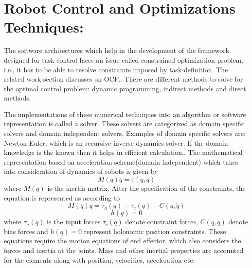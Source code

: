 \section{Robot Control and Optimizations Techniques:}
The software architectures which help in the development of the framework designed for task control faces an issue called constrained optimization problem. i.e., it has to be able to resolve constraints imposed by task definition. The related work section discusses on OCP.\cite{Reference to section related work}. There are different methods to solve for the optimal control problem:\cite{shakhimardanov2015} dynamic programming, indirect methods and direct methods.
\par
	The implementations of these numerical techniques into an algorithm or software representation is called a solver. These solvers are categorized as domain specific solvers and domain independent solvers. Examples of domain specific solvers are: Newton-Euler, which is an recursive inverse dynamics solver.  If the domain knowledge is the known then it helps in efficient calculation.\cite{shakhimardanov2015}. The mathematical representation based on acceleration scheme(domain independent) which takes into consideration of dynamics of robots is given by \cite{shakhimardanov2015}
	$$M(q)\ddot{q} = \tau(q,\dot{q})$$
	where $M(q)$ is the inertia matrix. After the specification of the constraints, the equation is represented as according to\cite{shakhimardanov2015}
	$$M(q)\ddot{q} = \tau_{a}(q) - \tau_{c}(q) - C(q,\dot{q})$$
	$$h(q) = 0$$
where $\tau_{a}(q)$ is the input forces $\tau_{c}(q)$ denote constraint forces, $C(q,\dot{q})$ denote bias forces and $h(q) = 0$ represent holonomic position constraints.\cite{shakhimardanov2015}
These equations require the motion equations of end effector, which also considers the forces and inertia at the joints. Mass and other inertial properties are accounted for the elements along with position, velocities, acceleration etc. \cite{vereshchagin1989modeling}

